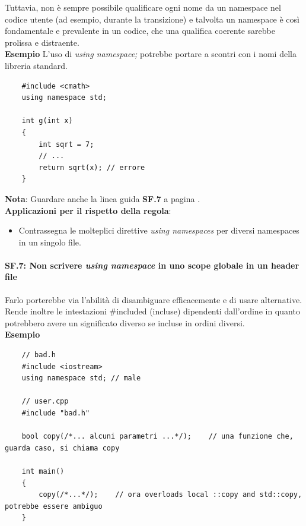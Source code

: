 \textsf{\small Tuttavia, non è sempre possibile qualificare ogni nome da un namespace nel codice utente (ad esempio, durante la transizione) e talvolta un namespace è così fondamentale e prevalente in un codice, che una qualifica coerente sarebbe prolissa e distraente.} \\

\textsf{\small \textbf{Esempio} L'uso di \emph{using namespace;} potrebbe portare a scontri con i nomi della libreria standard.} \\

\begin{lstlisting}
	#include <cmath>
	using namespace std;
	
	int g(int x)
	{
		int sqrt = 7;
		// ...
		return sqrt(x); // errore
	}
\end{lstlisting}


\textsf{\small \textbf{Nota}: Guardare anche la linea guida \textbf{SF.7} a pagina \pageref{SF_7}.} \\

\textsf{\small \textbf{Applicazioni per il rispetto della regola}: }

\begin{itemize}
	\item \textsf{\small Contrassegna le molteplici direttive \emph{using namespaces} per diversi namespaces in un singolo file.}
\end{itemize}

\paragraph{SF.7: Non scrivere \emph{using namespace} in uno scope globale in un header file}

\label{SF_7}

\textsf{\small Farlo porterebbe via l'abilità di disambiguare efficacemente e di usare alternative. Rende inoltre le intestazioni \#included (incluse) dipendenti dall'ordine in quanto potrebbero avere un significato diverso se incluse in ordini diversi. } \\

\textsf{\small \textbf{Esempio}}

\begin{lstlisting}
	// bad.h
	#include <iostream>
	using namespace std; // male
	
	// user.cpp
	#include "bad.h"
	
	bool copy(/*... alcuni parametri ...*/);    // una funzione che, guarda caso, si chiama copy
	
	int main()
	{
		copy(/*...*/);    // ora overloads local ::copy and std::copy, potrebbe essere ambiguo
	}
\end{lstlisting}

